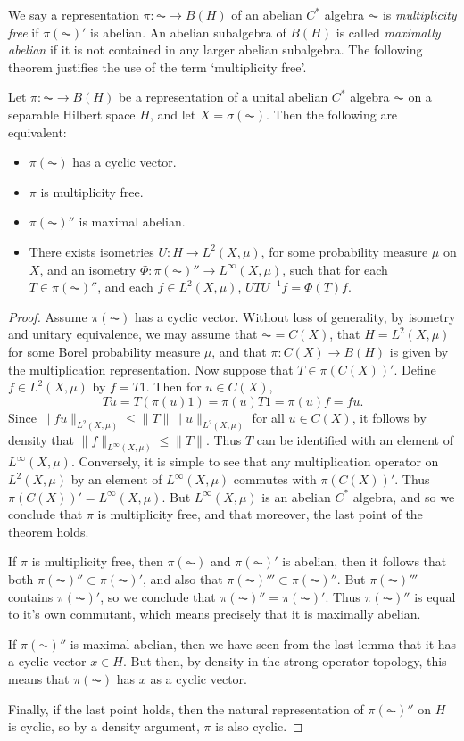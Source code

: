We say a representation $\pi: \AC \to B(H)$ of an abelian $C^*$ algebra $\AC$ is \emph{multiplicity free} if $\pi(\AC)'$ is abelian. An abelian subalgebra of $B(H)$ is called \emph{maximally abelian} if it is not contained in any larger abelian subalgebra. The following theorem justifies the use of the term `multiplicity free'.

\begin{theorem}
    Let $\pi: \AC \to B(H)$ be a representation of a unital abelian $C^*$ algebra $\AC$ on a separable Hilbert space $H$, and let $X = \sigma(\AC)$. Then the following are equivalent:
    \begin{itemize}
        \item $\pi(\AC)$ has a cyclic vector.
        \item $\pi$ is multiplicity free.
        \item $\pi(\AC)''$ is maximal abelian.
        \item There exists isometries $U: H \to L^2(X,\mu)$, for some probability measure $\mu$ on $X$, and an isometry $\Phi: \pi(\AC)'' \to L^\infty(X,\mu)$, such that for each $T \in \pi(\AC)''$, and each $f \in L^2(X,\mu)$, $UTU^{-1} f = \Phi(T) f$.
    \end{itemize}
\end{theorem}
\begin{proof}
    Assume $\pi(\AC)$ has a cyclic vector. Without loss of generality, by isometry and unitary equivalence, we may assume that $\AC = C(X)$, that $H = L^2(X,\mu)$ for some Borel probability measure $\mu$, and that $\pi: C(X) \to B(H)$ is given by the multiplication representation. Now suppose that $T \in \pi(C(X))'$. Define $f \in L^2(X,\mu)$ by $f = T1$. Then for $u \in C(X)$,
    \[ Tu = T(\pi(u) 1) = \pi(u) T1 = \pi(u) f = fu. \]
    Since $\| fu \|_{L^2(X,\mu)} \leq \| T \| \| u \|_{L^2(X,\mu)}$ for all $u \in C(X)$, it follows by density that $\| f \|_{L^\infty(X,\mu)} \leq \| T \|$. Thus $T$ can be identified with an element of $L^\infty(X,\mu)$. Conversely, it is simple to see that any multiplication operator on $L^2(X,\mu)$ by an element of $L^\infty(X,\mu)$ commutes with $\pi(C(X))'$. Thus $\pi(C(X))' = L^\infty(X,\mu)$. But $L^\infty(X,\mu)$ is an abelian $C^*$ algebra, and so we conclude that $\pi$ is multiplicity free, and that moreover, the last point of the theorem holds.

    If $\pi$ is multiplicity free, then $\pi(\AC)$ and $\pi(\AC)'$ is abelian, then it follows that both $\pi(\AC)'' \subset \pi(\AC)'$, and also that $\pi(\AC)''' \subset \pi(\AC)''$. But $\pi(\AC)'''$ contains $\pi(\AC)'$, so we conclude that $\pi(\AC)'' = \pi(\AC)'$. Thus $\pi(\AC)''$ is equal to it's own commutant, which means precisely that it is maximally abelian.

    If $\pi(\AC)''$ is maximal abelian, then we have seen from the last lemma that it has a cyclic vector $x \in H$. But then, by density in the strong operator topology, this means that $\pi(\AC)$ has $x$ as a cyclic vector.

    Finally, if the last point holds, then the natural representation of $\pi(\AC)''$ on $H$ is cyclic, so by a density argument, $\pi$ is also cyclic.
\end{proof}

